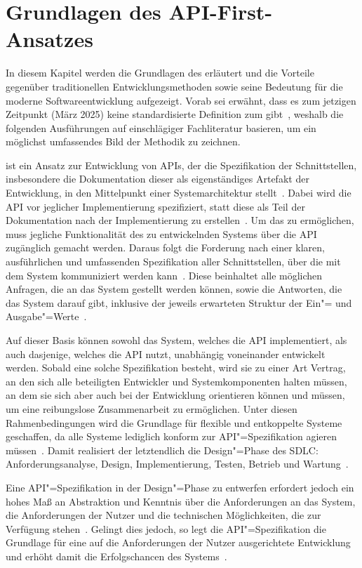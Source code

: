 \chapter{Grundlagen des API-First-Ansatzes}
In diesem Kapitel werden die Grundlagen des \AFAes erläutert und die Vorteile gegenüber traditionellen Entwicklungsmethoden sowie seine Bedeutung für die moderne Softwareentwicklung aufgezeigt.
Vorab sei erwähnt, dass es zum jetzigen Zeitpunkt (März 2025) keine standardisierte Definition zum \AFA gibt~\cite[77]{bea22}, weshalb die folgenden Ausführungen auf einschlägiger Fachliteratur basieren, um ein möglichst umfassendes Bild der Methodik zu zeichnen.

\AF ist ein Ansatz zur Entwicklung von \acp{API}, der die Spezifikation der Schnittstellen, insbesondere die Dokumentation dieser als eigenständiges Artefakt der Entwicklung, in den Mittelpunkt einer Systemarchitektur stellt~\cite[2]{kul23}.
Dabei wird die \ac{API} vor jeglicher Implementierung spezifiziert, statt diese als Teil der Dokumentation nach der Implementierung zu erstellen~\cites[349]{de23}[1627]{cha21}.
Um das zu ermöglichen, muss jegliche Funktionalität des zu entwickelnden Systems über die \ac{API} zugänglich gemacht werden.
Daraus folgt die Forderung nach einer klaren, ausführlichen und umfassenden Spezifikation aller Schnittstellen, über die mit dem System kommuniziert werden kann~\cite[75]{bea22}.
Diese beinhaltet alle möglichen Anfragen, die an das System gestellt werden können, sowie die Antworten, die das System darauf gibt, inklusive der jeweils erwarteten Struktur der Ein"= und Ausgabe"=Werte~\cite[350]{de23}.

Auf dieser Basis können sowohl das System, welches die \ac{API} implementiert, als auch dasjenige, welches die \ac{API} nutzt, unabhängig voneinander entwickelt werden.
Sobald eine solche Spezifikation besteht, wird sie zu einer Art Vertrag, an den sich alle beteiligten Entwickler und Systemkomponenten halten müssen, an dem sie sich aber auch bei der Entwicklung orientieren können und müssen, um eine reibungslose Zusammenarbeit zu ermöglichen.
Unter diesen Rahmenbedingungen wird die Grundlage für flexible und entkoppelte Systeme geschaffen, da alle Systeme lediglich konform zur \ac{API}"=Spezifikation agieren müssen~\cite[350,354,360]{de23}.
Damit realisiert der \AFA letztendlich die Design"=Phase des \ac{SDLC}: Anforderungsanalyse, Design, Implementierung, Testen, Betrieb und Wartung~\cite{vol22}.

Eine \ac{API}"=Spezifikation in der Design"=Phase zu entwerfen erfordert jedoch ein hohes Maß an Abstraktion und Kenntnis über die Anforderungen an das System, die Anforderungen der Nutzer und die technischen Möglichkeiten, die zur Verfügung stehen~\cite[362]{de23}.
Gelingt dies jedoch, so legt die \ac{API}"=Spezifikation die Grundlage für eine auf die Anforderungen der Nutzer ausgerichtete Entwicklung und erhöht damit die Erfolgschancen des Systems~\cite[1627]{cha21}.

